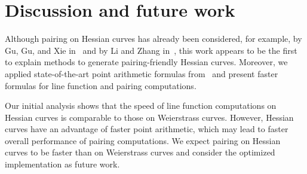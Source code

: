 \section{Discussion and future work}


Although pairing on Hessian curves has already been considered, for example, by Gu, Gu, and Xie in~\cite{2010/Gu} and by Li and Zhang in~\cite{2012/Li},
this work appears to be the first to explain methods to generate pairing-friendly Hessian curves.
Moreover, we applied state-of-the-art point arithmetic formulas from~\cite{2015/hessian}
and present faster formulas for line function and pairing computations.

Our initial analysis shows that the speed of line function computations on Hessian curves
is comparable to those on Weierstrass curves.
However, Hessian curves have an advantage of faster point arithmetic,
which may lead to faster overall performance of pairing computations.
We expect pairing on Hessian curves to be faster than on Weierstrass curves and
consider the optimized implementation as future work.

